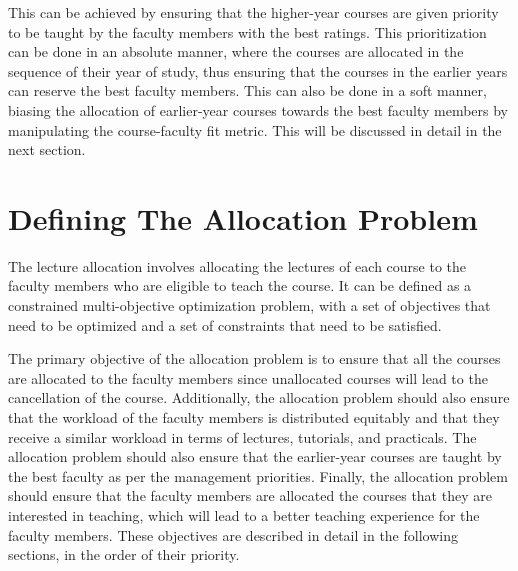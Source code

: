 This can be achieved by ensuring that the higher-year courses are given priority to be taught by the faculty members with the best ratings. This prioritization can be done in an absolute manner, where the courses are allocated in the sequence of their year of study, thus ensuring that the courses in the earlier years can reserve the best faculty members. This can also be done in a soft manner, biasing the allocation of earlier-year courses towards the best faculty members by manipulating the course-faculty fit metric. This will be discussed in detail in the next section.

\section{Defining The Allocation Problem}
\label{sec:defining_the_allocation_problem}

The lecture allocation involves allocating the lectures of each course to the faculty members who are eligible to teach the course. It can be defined as a constrained multi-objective optimization problem, with a set of objectives that need to be optimized and a set of constraints that need to be satisfied.

The primary objective of the allocation problem is to ensure that all the courses are allocated to the faculty members since unallocated courses will lead to the cancellation of the course. Additionally, the allocation problem should also ensure that the workload of the faculty members is distributed equitably and that they receive a similar workload in terms of lectures, tutorials, and practicals. The allocation problem should also ensure that the earlier-year courses are taught by the best faculty as per the management priorities. Finally, the allocation problem should ensure that the faculty members are allocated the courses that they are interested in teaching, which will lead to a better teaching experience for the faculty members. These objectives are described in detail in the following sections, in the order of their priority.

